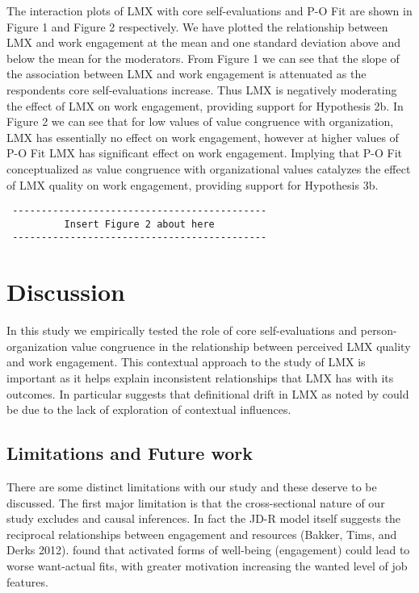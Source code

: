 \documentclass[12pt,a4paper,]{article}
\begin{document}
The interaction plots of LMX with core self-evaluations and P-O Fit are
shown in Figure 1 and Figure 2 respectively. We have plotted the
relationship between LMX and work engagement at the mean and one
standard deviation above and below the mean for the moderators. From
Figure 1 we can see that the slope of the association between LMX and
work engagement is attenuated as the respondents core self-evaluations
increase. Thus LMX is negatively moderating the effect of LMX on work
engagement, providing support for Hypothesis 2b. In Figure 2 we can see
that for low values of value congruence with organization, LMX has
essentially no effect on work engagement, however at higher values of
P-O Fit LMX has significant effect on work engagement. Implying that P-O
Fit conceptualized as value congruence with organizational values
catalyzes the effect of LMX quality on work engagement, providing
support for Hypothesis 3b.

\begin{verbatim}
 --------------------------------------------
          Insert Figure 2 about here
 --------------------------------------------
\end{verbatim}

\section{Discussion}\label{discussion}

In this study we empirically tested the role of core self-evaluations
and person-organization value congruence in the relationship between
perceived LMX quality and work engagement. This contextual approach to
the study of LMX is important as it helps explain inconsistent
relationships that LMX has with its outcomes. In particular suggests
that definitional drift in LMX as noted by could be due to the lack of
exploration of contextual influences.

\subsection{Limitations and Future
work}\label{limitations-and-future-work}

There are some distinct limitations with our study and these deserve to
be discussed. The first major limitation is that the cross-sectional
nature of our study excludes and causal inferences. In fact the JD-R
model itself suggests the reciprocal relationships between engagement
and resources (Bakker, Tims, and Derks 2012). found that activated forms
of well-being (engagement) could lead to worse want-actual fits, with
greater motivation increasing the wanted level of job features.
\end{document}
